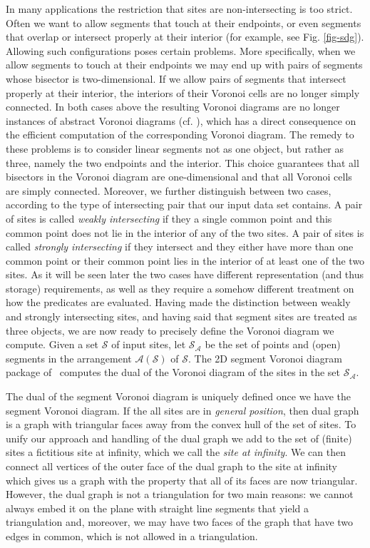 In many applications the restriction that sites are non-intersecting
is too strict. Often we want to allow segments that touch at their
endpoints, or even segments that overlap or intersect properly at
their interior (for example, see Fig. \ref{fig-sdg}). Allowing such
configurations poses certain problems. More specifically, when we allow
segments to touch at their endpoints we may end up with pairs of
segments whose bisector is two-dimensional. If we allow pairs of
segments that intersect properly at their interior, the interiors of
their Voronoi cells are no longer simply connected. In both cases
above the resulting Voronoi diagrams are no longer instances of
abstract Voronoi diagrams (cf. \cite{k-cavd-89}), which has a direct
consequence on the efficient computation of the corresponding Voronoi
diagram. The remedy to these problems is to consider linear segments
not as one object, but rather as three, namely the two endpoints and
the interior. This choice guarantees that all bisectors in the Voronoi
diagram are one-dimensional and that all Voronoi cells are simply
connected. Moreover, we further distinguish between two cases,
according to the type of intersecting pair that our input data set
contains. A pair of sites is called \emph{weakly intersecting} if they
a single common point and this common point does not lie in the
interior of any of the two sites. A pair of sites is called
\emph{strongly intersecting} if they intersect and they either have
more than one common point or their common point lies in the interior
of at least one of the two sites. As it will be seen later the two
cases have different representation (and thus storage) requirements,
as well as they require a somehow different treatment on how the
predicates are evaluated. Having made the distinction between weakly
and strongly intersecting sites, and having said that segment sites
are treated as three objects, we are now ready to precisely define the
Voronoi diagram we compute. Given a set $\mathcal{S}$ of input sites,
let $\mathcal{S}_{\mathcal{A}}$ be the set of points and
(open) segments in the arrangement $\mathcal{A}(\mathcal{S})$ of
$\mathcal{S}$. The 2D segment Voronoi diagram package of \cgal\
computes the dual of the Voronoi diagram of the sites in the set 
$\mathcal{S}_{\mathcal{A}}$.

The dual of the segment Voronoi diagram is uniquely defined once we
have the segment Voronoi diagram. If the all sites are in
\emph{general position}, then dual graph is a graph with triangular
faces away from the convex hull of the set of sites. To unify our approach
and handling of the dual graph we add to the set of (finite) sites
a fictitious site at infinity, which we call the
{\em site at infinity}. We can then connect all vertices of the outer
face of the dual graph to the site at infinity which gives us
a graph with the property that all of its faces are now
triangular. However, the dual graph is not a triangulation for
two main reasons: we cannot always embed it on the plane with straight
line segments that yield a triangulation and, moreover, we may have two
faces of the graph that have two edges in common, which is not allowed
in a triangulation.

